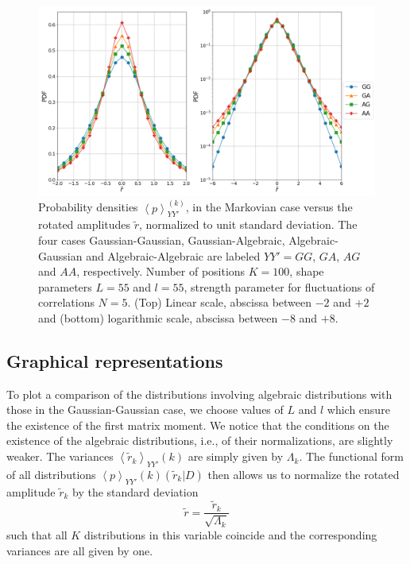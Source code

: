 \begin{figure}[htbp]
    \centering
    \includegraphics[width=0.9\columnwidth]
    {figures/07_distributions_comparison.png}
    \caption{Probability densities $\left\langle p \right\rangle_{YY'}^{\left(k\right)}$,
             in the Markovian case versus the rotated amplitudes $\tilde{r}$,
             normalized to unit standard deviation. The four cases Gaussian-Gaussian,
             Gaussian-Algebraic, Algebraic-Gaussian and Algebraic-Algebraic are
             labeled $YY' = GG$, $GA$, $AG$ and $AA$, respectively. Number of
             positions $K = 100$, shape parameters $L = 55$ and $l = 55$, strength
             parameter for fluctuations of correlations $N = 5$. (Top) Linear scale,
             abscissa between $-2$ and $+2$ and (bottom) logarithmic scale, abscissa
             between $-8$ and $+8$.}
    \label{fig:distributions_comparison}
\end{figure}

\subsection{Graphical representations}\label{subsec:graphical_distributions}

To plot a comparison of the distributions involving algebraic distributions
with those in the Gaussian-Gaussian case, we choose values of $L$ and $l$ which
ensure the existence of the first matrix moment. We notice that the conditions
on the existence of the algebraic distributions, i.e., of their normalizations,
are slightly weaker. The variances
$\left\langle \tilde{r}_{k} \right\rangle_{YY'}{\left(k\right)}$ are simply
given by $\Lambda_{k}$. The functional form of all distributions
$\left\langle p \right\rangle_{YY'}{\left(k\right)} \left(\tilde{r}_{k} \vert D \right)$
then allows us to normalize the rotated amplitude $\tilde{r}_k$ by the standard
deviation
\begin{equation}
    \tilde{r} = \frac{\tilde{r}_{k}}{\sqrt{\Lambda_{k}}}
\end{equation}
such that all $K$ distributions in this variable coincide and the corresponding
variances are all given by one.